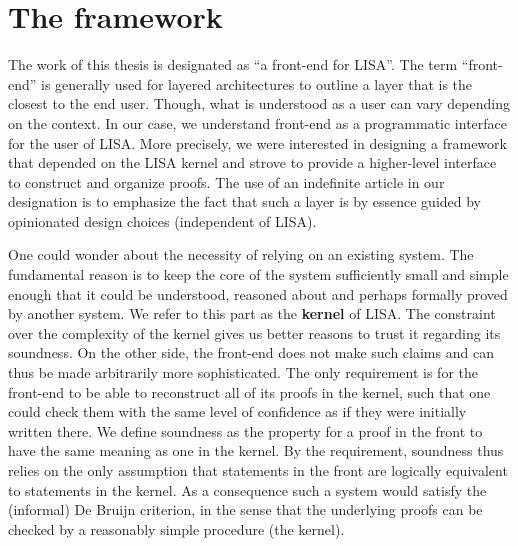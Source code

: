 \section{The framework}
\label{sec:framework}

The work of this thesis is designated as ``a front-end for LISA''. The term ``front-end'' is generally used for layered architectures to outline a layer that is the closest to the end user. Though, what is understood as a user can vary depending on the context. In our case, we understand front-end as a programmatic interface for the user of LISA. More precisely, we were interested in designing a framework that depended on the LISA kernel and strove to provide a higher-level interface to construct and organize proofs. The use of an indefinite article in our designation is to emphasize the fact that such a layer is by essence guided by opinionated design choices (independent of LISA).

One could wonder about the necessity of relying on an existing system. The fundamental reason is to keep the core of the system sufficiently small and simple enough that it could be understood, reasoned about and perhaps formally proved by another system. We refer to this part as the \textbf{kernel} of LISA. The constraint over the complexity of the kernel gives us better reasons to trust it regarding its soundness. On the other side, the front-end does not make such claims and can thus be made arbitrarily more sophisticated. The only requirement is for the front-end to be able to reconstruct all of its proofs in the kernel, such that one could check them with the same level of confidence as if they were initially written there. We define soundness as the property for a proof in the front to have the same meaning as one in the kernel. By the requirement, soundness thus relies on the only assumption that statements in the front are logically equivalent to statements in the kernel. As a consequence such a system would satisfy the (informal) De Bruijn criterion, in the sense that the underlying proofs can be checked by a reasonably simple procedure (the kernel).

